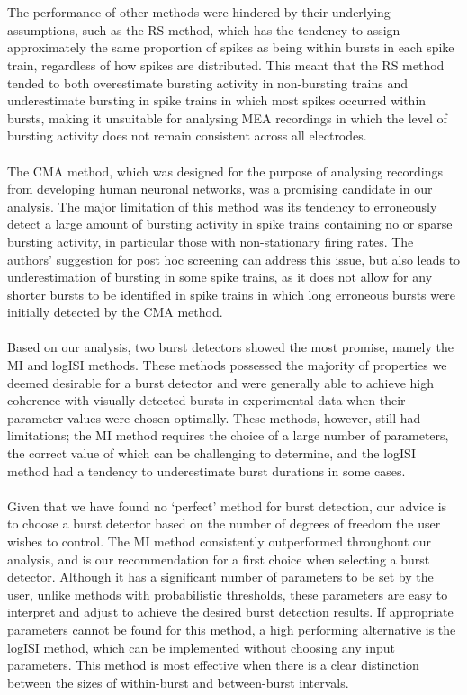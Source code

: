 \documentclass[12pt, titlepage]{article}
\begin{document}
	\\ \\The performance of other methods were hindered by their underlying assumptions, such as the RS method, which has the tendency to assign approximately the same proportion of spikes as being within bursts in each spike train, regardless of how spikes are distributed. This meant that the RS method tended to both overestimate bursting activity in non-bursting trains and underestimate bursting in spike trains in which most spikes occurred within bursts, making it unsuitable for analysing MEA recordings in which the level of bursting activity does not remain consistent across all electrodes.
	\\ \\The CMA method, which was designed for the purpose of analysing recordings from developing human neuronal networks, was a promising candidate in our analysis. The major limitation of this method was its tendency to erroneously detect a large amount of bursting activity in spike trains containing no or sparse bursting activity, in particular those with non-stationary firing rates.  The authors' suggestion for post hoc screening can address this issue, but also leads to underestimation of bursting in some spike trains, as it does not allow for any shorter bursts to be identified in spike trains in which long erroneous bursts were initially detected by the CMA method. 
	\\ \\ Based on our analysis, two burst detectors showed the most promise, namely the MI and logISI methods. These methods possessed the majority of properties we deemed desirable for a burst detector and were generally able to achieve high coherence with visually detected bursts in experimental data when their parameter values were chosen optimally. These methods, however, still had limitations; the MI method requires the choice of a large number of parameters, the correct value of which can be challenging to determine, and the logISI method had a tendency to underestimate burst durations in some cases.
	\\ \\Given that we have found no `perfect' method for burst detection, our advice is to choose a burst detector based on the number of degrees of freedom the user wishes to control.
	The MI method consistently outperformed throughout our analysis, and is our recommendation for a first choice when selecting a burst detector. Although it has a significant number of parameters to be set by the user, unlike methods with probabilistic thresholds, these parameters are easy to interpret and adjust to achieve the desired burst detection results. If appropriate parameters cannot be found for this method, a high performing alternative is the logISI method, which can be implemented without choosing any input parameters. This method is most effective when there is a clear distinction between the sizes of within-burst and between-burst intervals. 
\end{document}
